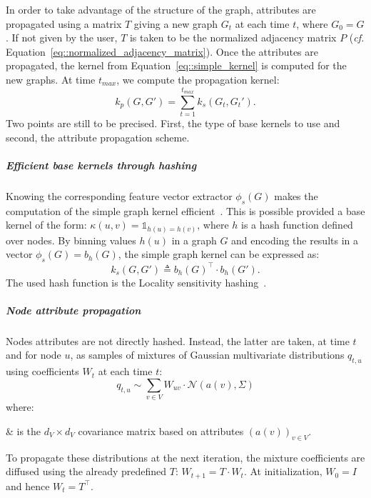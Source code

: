                 In order to take advantage of the structure of the graph, attributes are propagated using a matrix $T$ giving a new graph $G_t$ at each time $t$, where $G_0 = G$.
                If not given by the user, \(T\) is taken to be the normalized adjacency matrix $P$ (\textit{cf.} Equation~\ref{eq::normalized_adjacency_matrix}).
                Once the attributes are propagated, the kernel from Equation~\ref{eq::simple_kernel} is computed for the new graphs.
                At time $t_{max}$, we compute the propagation kernel:
                \begin{equation}
                    \label{eq::propagation_kernel}
                    k_p(G, G') = \sum_{t=1}^{t_{max}} k_s(G_t, G_t').
                \end{equation}
                Two points are still to be precised.
                First, the type of base kernels to use and second, the attribute propagation scheme.\\

                \subparagraph{Efficient base kernels through hashing}
                    Knowing the corresponding feature vector extractor $\phi_s(G)$ makes the computation of the simple graph kernel efficient~\parencite{shervashidze2011weisfeiler,neumann2016propagation}.
                    This is possible provided a base kernel of the form: $\kappa(u, v) = \mathbb{1}_{h(u) = h(v)}$, where $h$ is a hash function defined over nodes.
                    By binning values $h(u)$ in a graph $G$ and encoding the results in a vector $\phi_s(G) = b_h(G)$, the simple graph kernel can be expressed as:
                    \begin{equation}
                        \label{eq::simple_kernel_binning}
                        k_s(G, G') \triangleq b_h(G)^\intercal\cdot b_h(G').
                    \end{equation}
                    The used hash function is the Locality sensitivity hashing~\parencite{neumann2016propagation}.\\

                \subparagraph{Node attribute propagation}
                    Nodes attributes are not directly hashed.
                    Instead, the latter are taken, at time $t$ and for node $u$, as samples of mixtures of Gaussian multivariate distributions $q_{t, u}$ using coefficients $W_t$ at each time $t$:
                    \begin{equation}
                        \label{eq::attribute_samples}
                        q_{t, u} \sim \sum_{v \in V} W_{uv}\cdot \mathscr{N}(a(v), \Sigma)
                    \end{equation}
                    where:
                    \begin{conditions}
                        \Sigma & is the $d_V \times d_V$ covariance matrix based on attributes $\left(a(v)\right)_{v\in V}$.
                    \end{conditions}
                    To propagate these distributions at the next iteration, the mixture coefficients are diffused using the already predefined $T$: $W_{t+1} = T\cdot W_t$.
                    At initialization, $W_0 = I$ and hence $W_t= T^\intercal$.

